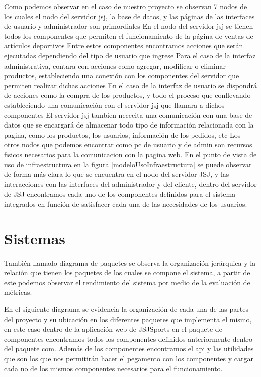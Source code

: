 Como podemos observar en el caso de nuestro proyecto se observan 7 nodos de los cuales el nodo del servidor jsj, la base de datos, y las páginas de las interfaces de usuario y administrador son primordiales
En el nodo del servidor jsj se tienen todos los componentes que permiten el funcionamiento de la página de ventas de artículos deportivos
Entre estos componentes encontramos acciones que serán ejecutadas dependiendo del tipo de usuario que ingrese
Para el caso de la interfaz administrativa, contara con acciones como agregar, modificar o eliminar productos, estableciendo una conexión con los componentes del servidor que permiten realizar dichas acciones
En el caso de la interfaz de usuario se dispondrá de acciones como la compra de los productos, y todo el proceso que conllevando estableciendo una comunicación con el servidor jsj que llamara a dichos componentes
El servidor jsj tambien nececita una comunicación con una base de datos que se encargará de almacenar todo tipo de información relacionada con la pagina, como los productos, los usuarios, información de los pedidos, etc
Los otros nodos que podemos encontrar como pc de usuario y de admin son recursos fisicos necesarios para la comunicacion con la pagina web. \newline
En el punto de vista de uso de infraestructura en la figura \ref{modeloUsoInfraestructura} se puede observar de forma más clara lo que se encuentra en el nodo del servidor JSJ, y las interacciones con las interfaces del administrador y del cliente, dentro del servidor de JSJ encontramos cada uno de los componentes definidos para el sistema integrados en función de satisfacer cada una de las necesidades de los usuarios.
\newpage

\section{Sistemas}
También llamado diagrama de paquetes se observa la organización jerárquica y la relación que tienen los paquetes de los cuales se compone el sistema, a partir de este podemos observar el rendimiento del sistema por medio de la evaluación de métricas.

En el siguiente diagrama se evidencia la organización de cada una de las partes del proyecto y su ubicación en los diferentes paquetes que implementa el mismo, en este caso dentro de la aplicación web de JSJSports en el paquete de componentes encontramos todos los componentes definidos anteriormente dentro del paquete com. Además de los componentes encontramos el api y las utilidades que son los que nos permitirán hacer el pegamento con los componentes y cargar cada no de los mismos componentes necesarios para el funcionamiento.

